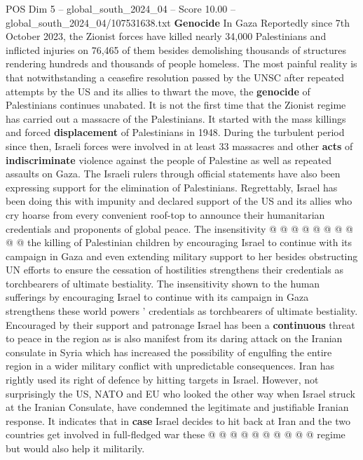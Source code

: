 \begin{textsample}{POS Dim 5 – global\_south\_2024\_04 – Score 10.00 – global\_south\_2024\_04/107531638.txt}  \label{ex:f5_pos_338}
\textbf{Genocide} In Gaza Reportedly since 7th October 2023, the Zionist forces have killed nearly 34,000 Palestinians and inflicted injuries on 76,465 of them besides demolishing thousands of structures rendering hundreds and thousands of people homeless.
The most painful reality is that notwithstanding a ceasefire resolution passed by the UNSC after repeated attempts by the US and its allies to thwart the move, the \textbf{genocide} of Palestinians continues unabated.
It is not the first time that the Zionist regime has carried out a massacre of the Palestinians.
It started with the mass killings and forced \textbf{displacement} of Palestinians in 1948.
During the turbulent period since then, Israeli forces were involved in at least 33 massacres and other \textbf{acts} of \textbf{indiscriminate} violence against the people of Palestine as well as repeated assaults on Gaza.
The Israeli rulers through official statements have also been expressing support for the elimination of Palestinians.
Regrettably, Israel has been doing this with impunity and declared support of the US and its allies who cry hoarse from every convenient roof-top to announce their humanitarian credentials and proponents of global peace.
The insensitivity @ @ @ @ @ @ @ @ @ @ the killing of Palestinian children by encouraging Israel to continue with its campaign in Gaza and even extending military support to her besides obstructing UN efforts to ensure the cessation of hostilities strengthens their credentials as torchbearers of ultimate bestiality.
The insensitivity shown to the human sufferings by encouraging Israel to continue with its campaign in Gaza strengthens these world powers ' credentials as torchbearers of ultimate bestiality.
Encouraged by their support and patronage Israel has been a \textbf{continuous} threat to peace in the region as is also manifest from its daring attack on the Iranian consulate in Syria which has increased the possibility of engulfing the entire region in a wider military conflict with unpredictable consequences.
Iran has rightly used its right of defence by hitting targets in Israel.
However, not surprisingly the US, NATO and EU who looked the other way when Israel struck at the Iranian Consulate, have condemned the legitimate and justifiable Iranian response.
It indicates that in \textbf{case} Israel decides to hit back at Iran and the two countries get involved in full-fledged war these @ @ @ @ @ @ @ @ @ @ regime but would also help it militarily.

\end{textsample}

